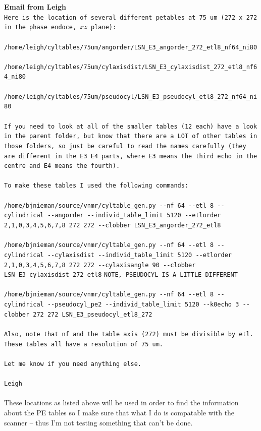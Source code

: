 \documentclass[11 pt]{article}
\newcommand{\bo}{\noindent\textbf}
\begin{document}
      
      \bo{Email from Leigh}\\
	\texttt{Here is the location of several different petables at 75 um (272 x 272 in the phase endoce, $xz$ plane):}\\\\
    	    \verb!/home/leigh/cyltables/75um/angorder/LSN_E3_angorder_272_etl8_nf64_ni80!\\\\
	    \verb!/home/leigh/cyltables/75um/cylaxisdist/LSN_E3_cylaxisdist_272_etl8_nf64_ni80!\\\\
	    \verb!/home/leigh/cyltables/75um/pseudocyl/LSN_E3_pseudocyl_etl8_272_nf64_ni80!\\\\
	    \texttt{If you need to look at all of the smaller tables (12 each) have a look in the parent folder, but know that there are a LOT of other tables in those folders, so just be careful to read the names carefully (they are different in the E3 E4 parts, where E3 means the third echo in the centre and E4 means the fourth).}\\\\
	    \texttt{To make these tables I used the following commands:}\\\\
	    \verb!/home/bjnieman/source/vnmr/cyltable_gen.py --nf 64 --etl 8 --cylindrical --angorder --individ_table_limit 5120 --etlorder 2,1,0,3,4,5,6,7,8 272 272 --clobber LSN_E3_angorder_272_etl8!\\\\
	    \verb!/home/bjnieman/source/vnmr/cyltable_gen.py --nf 64 --etl 8 --cylindrical --cylaxisdist --individ_table_limit 5120 --etlorder 2,1,0,3,4,5,6,7,8 272 272 --cylaxisangle 90 --clobber LSN_E3_cylaxisdist_272_etl8!
	    \texttt{NOTE, PSEUDOCYL IS A LITTLE DIFFERENT}\\\\
	    \verb!/home/bjnieman/source/vnmr/cyltable_gen.py --nf 64 --etl 8 --cylindrical --pseudocyl_pe2 --individ_table_limit 5120 --k0echo 3 --clobber 272 272 LSN_E3_pseudocyl_etl8_272!\\\\
	    \texttt{Also, note that nf and the table axis (272) must be divisible by etl. These tables all have a resolution of 75 um.}\\\\
	    \texttt{Let me know if you need anything else.}\\\\
	\texttt{Leigh}\\\\

      These locations as listed above will be used in order to find the information about the PE tables so I make sure that what I do is compatable with the scanner -- thus I'm not testing something that can't be done. 
  
\end{document}
